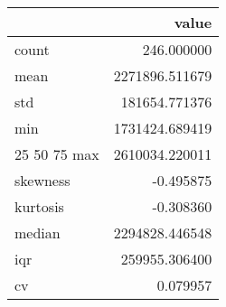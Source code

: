 \begin{tabular}{lr}
\toprule
 & value \\
\midrule
count & 246.000000 \\
mean & 2271896.511679 \\
std & 181654.771376 \\
min & 1731424.689419 \\
25%
50%
75%
max & 2610034.220011 \\
skewness & -0.495875 \\
kurtosis & -0.308360 \\
median & 2294828.446548 \\
iqr & 259955.306400 \\
cv & 0.079957 \\
\bottomrule
\end{tabular}
